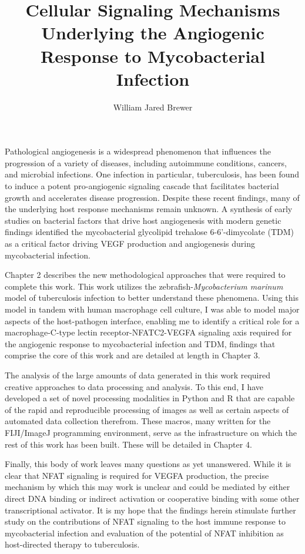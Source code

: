 \documentclass[PhD]{dukethesis2006}
\author{William Jared Brewer}
\title{Cellular Signaling Mechanisms Underlying the Angiogenic Response to Mycobacterial Infection}
\begin{document}
\maketitle{}

\makeabstract{}

\Copyright

\begin{doublespace}

\abstract

Pathological angiogenesis is a widespread phenomenon that influences the progression of a variety of diseases, including autoimmune conditions, cancers, and microbial infections. One infection in particular, tuberculosis, has been found to induce a potent pro-angiogenic signaling cascade that facilitates bacterial growth and accelerates disease progression. Despite these recent findings, many of the underlying host response mechanisms remain unknown. A synthesis of early studies on bacterial factors that drive host angiogenesis with modern genetic findings identified the mycobacterial glycolipid trehalose 6-6'-dimycolate (TDM) as a critical factor driving VEGF production and angiogenesis during mycobacterial infection. 

Chapter 2 describes the new methodological approaches that were required to complete this work. This work utilizes the zebrafish-\textit{Mycobacterium marinum} model of tuberculosis infection to better understand these phenomena. Using this model in tandem with human macrophage cell culture, I was able to model major aspects of the host-pathogen interface, enabling me to identify a critical role for a macrophage-C-type lectin receptor-NFATC2-VEGFA signaling axis required for the angiogenic response to mycobacterial infection and TDM, findings that comprise the core of this work and are detailed at length in Chapter 3. 

The analysis of the large amounts of data generated in this work required creative approaches to data processing and analysis. To this end, I have developed a set of novel processing modalities in Python and R that are capable of the rapid and reproducible processing of images as well as certain aspects of automated data collection therefrom. These macros, many written for the FIJI/ImageJ programming environment, serve as the infrastructure on which the rest of this work has been built. These will be detailed in Chapter 4.

Finally, this body of work leaves many questions as yet unanswered. While it is clear that NFAT signaling is required for VEGFA production, the precise mechanism by which this may work is unclear and could be mediated by either direct DNA binding or indirect activation or cooperative binding with some other transcriptional activator. It is my hope that the findings herein stimulate further study on the contributions of NFAT signaling to the host immune response to mycobacterial infection and evaluation of the potential of NFAT inhibition as host-directed therapy to tuberculosis.


\end{doublespace}
\end{document}
